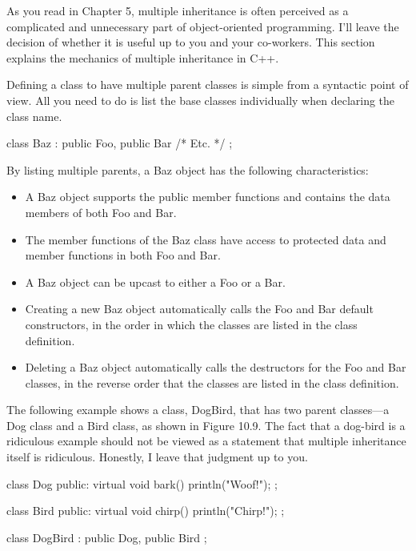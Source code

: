 
As you read in Chapter 5, multiple inheritance is often perceived as a complicated and unnecessary part of object-oriented programming. I’ll leave the decision of whether it is useful up to you and your co-workers. This section explains the mechanics of multiple inheritance in C++.


Defining a class to have multiple parent classes is simple from a syntactic point of view. All you need to do is list the base classes individually when declaring the class name.

\begin{cpp}
class Baz : public Foo, public Bar { /* Etc. */ };
\end{cpp}

By listing multiple parents, a Baz object has the following characteristics:

\begin{itemize}
\item
A Baz object supports the public member functions and contains the data members of both Foo and Bar.

\item
The member functions of the Baz class have access to protected data and member functions in both Foo and Bar.

\item
A Baz object can be upcast to either a Foo or a Bar.

\item
Creating a new Baz object automatically calls the Foo and Bar default constructors, in the order in which the classes are listed in the class definition.

\item
Deleting a Baz object automatically calls the destructors for the Foo and Bar classes, in the reverse order that the classes are listed in the class definition.
\end{itemize}

The following example shows a class, DogBird, that has two parent classes—a Dog class and a Bird class, as shown in Figure 10.9. The fact that a dog-bird is a ridiculous example should not be viewed as a statement that multiple inheritance itself is ridiculous. Honestly, I leave that judgment up to you.


\begin{cpp}
class Dog
{
    public:
        virtual void bark() { println("Woof!"); }
};

class Bird
{
    public:
        virtual void chirp() { println("Chirp!"); }
};

class DogBird : public Dog, public Bird
{
};
\end{cpp}

